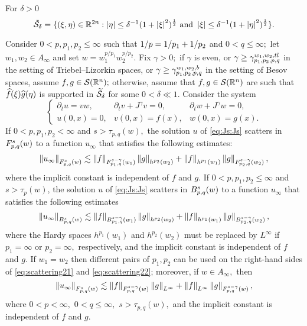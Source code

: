{For $\delta >0$ 
\[ \tilde{\Ss}_{\delta}=\{(\xi,\eta)\in \re^{2n}: \abs{\eta}\le \delta^{-1}(1+\abs{\xi}^2)^\frac{1}{2} \text{ and }\abs{\xi}\le \delta^{-1}(1+\abs{\eta}^2)^\frac{1}{2}\}.\]



\begin{theorem}\label{thm:scattering2} Consider  $0 < p, p_1, p_2  \le \infty$  such that $\hcline$ and  $0 < q \leq \infty;$ let  $w_1,w_2\in A_\infty$ and set $w=w_1^{{p}/{p_1}} w_2^{{p}/{p_2}}.$ Fix $\gamma>0;$ if $\gamma$ is even, or $\gamma\ge \gamt$ in the setting of Triebel--Lizorkin spaces, or $\gamma\ge \gamb$ in the setting of Besov spaces, assume $f, g \in \sw;$ otherwise, assume that $f,g\in\sw$ are such that $\fhat(\xi)\ghat(\eta)$ is supported in $\widetilde{\Ss}_{\delta}$ for some $0<\delta\ll1.$ Consider the system 
\begin{equation}\label{eq:Js:Js}
\left\{ \begin{array}{lll}  \partial_t u =vw, & \partial_t v +J^\gamma v = 0, & \partial_t w + J^\gamma w = 0, \\
  u(0,x)=0,&v(0,x)=f(x),&w(0,x) = g(x).
 \end{array} \right.
\end{equation}
If $0 < p,p_1,p_2 < \infty$ and  $s > \tau_{p,q}(w),$ the solution $u$ of \eqref{eq:Js:Js}  scatters in $\itlw{p}{s}{q}{w}$ to a function $u_\infty$ that satisfies the following estimates: 
\begin{equation}\label{eq:scattering21}
\norm{u_\infty}{\itlw{p}{s}{q}{w}} \lesssim \norm{f}{\itlw{p_1}{s-\gamma}{q}{w_1} } \norm{g}{h^{p_2}(w_2)} +  \norm{f}{h^{p_1}(w_1)}   \norm{g}{\itlw{p_2}{s-\gamma}{q}{w_2} },
\end{equation}
where the implicit constant is independent of $f$ and $g.$  
If $0< p, p_1,p_2\leq \infty$ and $s > \tau_p(w)$, the solution $u$ of \eqref{eq:Js:Js}  scatters in $\ibesw{p}{s}{q}{w}$ to a function $u_\infty$ that satisfies the following estimates
\begin{equation}\label{eq:scattering22}
\norm{u_\infty}{\ibesw{p}{s}{q}{w}} \lesssim \norm{f}{\ibesw{p_1}{s-\gamma}{q}{w_1} } \norm{g}{h^{p_2}(w_2)} +  \norm{f}{h^{p_1}(w_1)}   \norm{g}{\ibesw{p_2}{s-\gamma}{q}{w_2} },
\end{equation}
where the Hardy spaces $h^{p_1}(w_1)$ and $h^{p_2}(w_2)$ must be replaced by $L^\infty$ if $p_1=\infty$ or $p_2=\infty,$ respectively, and the implicit constant is independent of $f$ and $g.$  
If $w_1=w_2$ then different pairs of $p_1, p_2$ can be used on the right-hand sides of \eqref{eq:scattering21} and \eqref{eq:scattering22}; moreover, if $w\in A_\infty,$ then 
\begin{equation*}
\norm{u_\infty}{\itlw{p}{s}{q}{w}} \lesssim \norm{f}{\itlw{p}{s-\gamma}{q}{w} } \norm{g}{L^\infty} +  \norm{f}{L^\infty}   \norm{g}{\itlw{p}{s-\gamma}{q}{w}},
\end{equation*}
where $0<p<\infty,$ $0<q\le\infty,$  $s>\tau_{p,q}(w),$ and the implicit constant is independent of $f$ and $g.$  
\end{theorem}  
 
}
